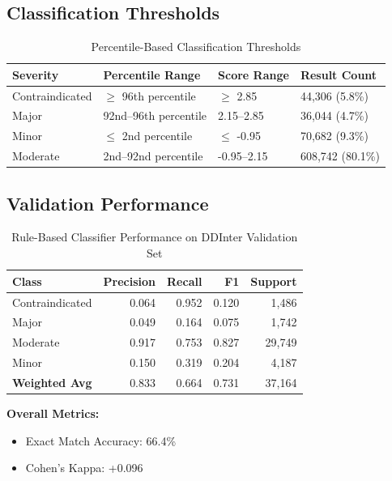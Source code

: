 \documentclass[11pt,a4paper]{article}
\begin{document}
\subsection{Classification Thresholds}

\begin{table}[h]
\centering
\caption{Percentile-Based Classification Thresholds}
\begin{tabular}{@{}llll@{}}
\toprule
\textbf{Severity} & \textbf{Percentile Range} & \textbf{Score Range} & \textbf{Result Count} \\
\midrule
Contraindicated & $\geq$ 96th percentile & $\geq$ 2.85 & 44,306 (5.8\%) \\
Major & 92nd--96th percentile & 2.15--2.85 & 36,044 (4.7\%) \\
Minor & $\leq$ 2nd percentile & $\leq$ -0.95 & 70,682 (9.3\%) \\
Moderate & 2nd--92nd percentile & -0.95--2.15 & 608,742 (80.1\%) \\
\bottomrule
\end{tabular}
\end{table}

\subsection{Validation Performance}

\begin{table}[h]
\centering
\caption{Rule-Based Classifier Performance on DDInter Validation Set}
\begin{tabular}{@{}lrrrr@{}}
\toprule
\textbf{Class} & \textbf{Precision} & \textbf{Recall} & \textbf{F1} & \textbf{Support} \\
\midrule
Contraindicated & 0.064 & 0.952 & 0.120 & 1,486 \\
Major & 0.049 & 0.164 & 0.075 & 1,742 \\
Moderate & 0.917 & 0.753 & 0.827 & 29,749 \\
Minor & 0.150 & 0.319 & 0.204 & 4,187 \\
\midrule
\textbf{Weighted Avg} & 0.833 & 0.664 & 0.731 & 37,164 \\
\bottomrule
\end{tabular}
\end{table}

\textbf{Overall Metrics:}
\begin{itemize}
    \item Exact Match Accuracy: 66.4\%
    \item Cohen's Kappa: +0.096
\end{itemize}
\end{document}
